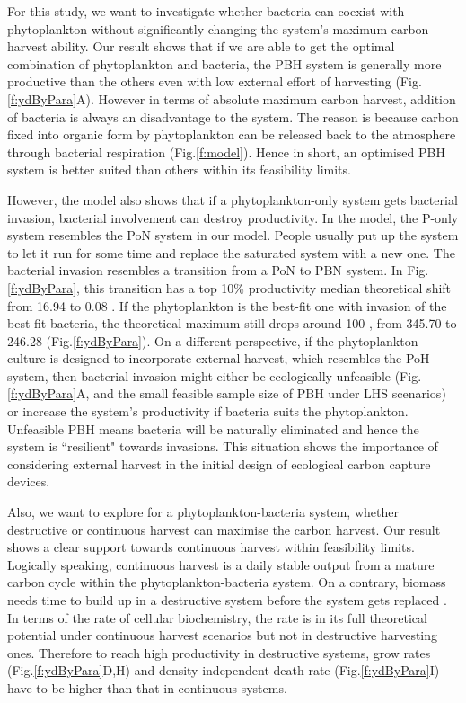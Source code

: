 \documentclass[../thesis.tex]{subfiles} %
\begin{document}
For this study, we want to investigate whether bacteria can coexist with phytoplankton without significantly changing the system’s maximum carbon harvest ability.  Our result shows that if we are able to get the optimal combination of phytoplankton and bacteria, the PBH system is generally more productive than the others even with low external effort of harvesting (Fig.\ref{f:ydByPara}A).  However in terms of absolute maximum carbon harvest, addition of bacteria is always an disadvantage to the system.  The reason is because carbon fixed into organic form by phytoplankton can be released back to the atmosphere through bacterial respiration (Fig.\ref{f:model}).  Hence in short, an optimised PBH system is better suited than others within its feasibility limits.

However, the model also shows that if a phytoplankton-only system gets bacterial invasion, bacterial involvement can destroy productivity.  In the model, the P-only system resembles the PoN system in our model.  People usually put up the system to let it run for some time and replace the saturated system with a new one.  The bacterial invasion resembles a transition from a PoN to PBN system.  In Fig.\ref{f:ydByPara}, this transition has a top 10\% productivity median theoretical shift from 16.94 to 0.08 \dxdt.  If the phytoplankton is the best-fit one with invasion of the best-fit bacteria, the theoretical maximum still drops around 100 \dxdt, from 345.70 to 246.28 (Fig.\ref{f:ydByPara}).  On a different perspective, if the phytoplankton culture is designed to incorporate external harvest, which resembles the PoH system, then bacterial invasion might either be ecologically unfeasible (Fig.\ref{f:ydByPara}A, and the small feasible sample size of PBH under LHS scenarios) or increase the system’s productivity if bacteria suits the phytoplankton.  Unfeasible PBH means bacteria will be naturally eliminated and hence the system is ``resilient" towards invasions.  This situation shows the importance of considering external harvest in the initial design of ecological carbon capture devices.

Also, we want to explore for a phytoplankton-bacteria system, whether destructive or continuous harvest can maximise the carbon harvest.  Our result shows a clear support towards continuous harvest within feasibility limits.  Logically speaking, continuous harvest is a daily stable output from a mature carbon cycle within the phytoplankton-bacteria system.  On a contrary, biomass needs time to build up in a destructive system before the system gets replaced \autocite{aytekin2016statistical}.  In terms of the rate of cellular biochemistry, the rate is in its full theoretical potential under continuous harvest scenarios but not in destructive harvesting ones.  Therefore to reach high productivity in destructive systems, grow rates (Fig.\ref{f:ydByPara}D,H) and density-independent death rate (Fig.\ref{f:ydByPara}I) have to be higher than that in continuous systems.
\end{document}
